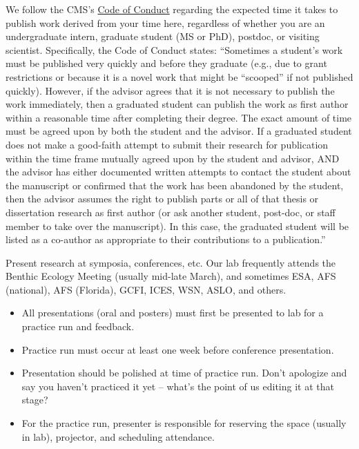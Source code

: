 \documentclass[
]{article}
\providecommand{\tightlist}{%
  \setlength{\itemsep}{0pt}\setlength{\parskip}{0pt}}
\begin{document}
We follow the CMS's \href{https://www.usf.edu/marine-science/about-us/college-documents.aspx/}{Code of Conduct} regarding the expected time it takes to publish work derived from your time here, regardless of whether you are an undergraduate intern, graduate student (MS or PhD), postdoc, or visiting scientist. Specifically, the Code of Conduct states: ``Sometimes a student's work must be published very quickly and before they graduate (e.g., due to grant restrictions or because it is a novel work that might be ``scooped'' if not published quickly). However, if the advisor agrees that it is not necessary to publish the work immediately, then a graduated student can publish the work as first author within a reasonable time after completing their degree. The exact amount of time must be agreed upon by both the student and the advisor. If a graduated student does not make a good-faith attempt to submit their research for publication within the time frame mutually agreed upon by the student and advisor, AND the advisor has either documented written attempts to contact the student about the manuscript or confirmed that the work has been abandoned by the student, then the advisor assumes the right to publish parts or all of that thesis or dissertation research as first author (or ask another student, post-doc, or staff member to take over the manuscript). In this case, the graduated student will be listed as a co-author as appropriate to their contributions to a publication.''

Present research at symposia, conferences, etc. Our lab frequently attends the Benthic Ecology Meeting (usually mid-late March), and sometimes ESA, AFS (national), AFS (Florida), GCFI, ICES, WSN, ASLO, and others.

\begin{itemize}
\tightlist
\item
  All presentations (oral and posters) must first be presented to lab for a practice run and feedback.
\item
  Practice run must occur at least one week before conference presentation.
\item
  Presentation should be polished at time of practice run. Don't apologize and say you haven't practiced it yet -- what's the point of us editing it at that stage?
\item
  For the practice run, presenter is responsible for reserving the space (usually in lab), projector, and scheduling attendance.
\end{itemize}
\end{document}
